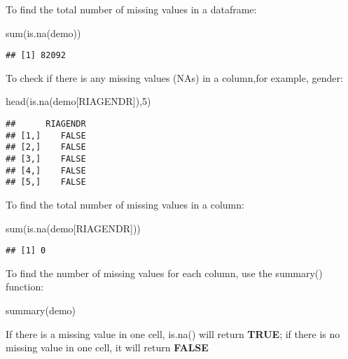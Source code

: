 \documentclass[
]{book}
\newenvironment{Shaded}{\begin{snugshade}}{\end{snugshade}}
\newcommand{\DecValTok}[1]{\textcolor[rgb]{0.00,0.00,0.81}{#1}}
\newcommand{\FunctionTok}[1]{\textcolor[rgb]{0.00,0.00,0.00}{#1}}
\newcommand{\NormalTok}[1]{#1}
\newcommand{\StringTok}[1]{\textcolor[rgb]{0.31,0.60,0.02}{#1}}
\begin{document}
To find the total number of missing values in a dataframe:

\begin{Shaded}
\begin{Highlighting}[]
\FunctionTok{sum}\NormalTok{(}\FunctionTok{is.na}\NormalTok{(demo))}
\end{Highlighting}
\end{Shaded}

\begin{verbatim}
## [1] 82092
\end{verbatim}

To check if there is any missing values (NAs) in a column,for example, gender:

\begin{Shaded}
\begin{Highlighting}[]
\FunctionTok{head}\NormalTok{(}\FunctionTok{is.na}\NormalTok{(demo[}\StringTok{\textquotesingle{}RIAGENDR\textquotesingle{}}\NormalTok{]),}\DecValTok{5}\NormalTok{)}
\end{Highlighting}
\end{Shaded}

\begin{verbatim}
##      RIAGENDR
## [1,]    FALSE
## [2,]    FALSE
## [3,]    FALSE
## [4,]    FALSE
## [5,]    FALSE
\end{verbatim}

To find the total number of missing values in a column:

\begin{Shaded}
\begin{Highlighting}[]
\FunctionTok{sum}\NormalTok{(}\FunctionTok{is.na}\NormalTok{(demo[}\StringTok{\textquotesingle{}RIAGENDR\textquotesingle{}}\NormalTok{]))}
\end{Highlighting}
\end{Shaded}

\begin{verbatim}
## [1] 0
\end{verbatim}

To find the number of missing values for each column, use the summary() function:

\begin{Shaded}
\begin{Highlighting}[]
\FunctionTok{summary}\NormalTok{(demo)}
\end{Highlighting}
\end{Shaded}

If there is a missing value in one cell, is.na() will return \textbf{TRUE}; if there is no missing value in one cell, it will return \textbf{FALSE}
\end{document}

